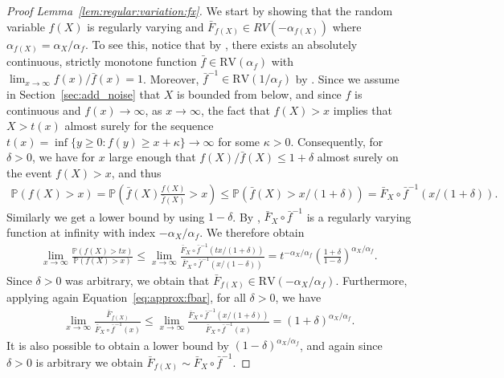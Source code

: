 \documentclass{statsoc}
\theoremstyle{break}
\renewcommand{\P}{\mathbb P}
\begin{document}
\begin{proof}[Proof Lemma~\ref{lem:regular:variation:fx}]
	We start by showing that the random variable $f(X)$ is regularly varying and $\bar F_{f(X)} \in RV(-\alpha_{f(X)})$ where $\alpha_{f(X)} = \alpha_X/\alpha_f$. 
	To see this, notice that by \citet[Proposition 2.6(vii)]{resnick:2007}, there exists an absolutely continuous, strictly monotone function $\bar f \in \text{RV}(\alpha_f)$ with $\lim_{x\to\infty} f(x) / \bar f(x) = 1$.
	Moreover, $\bar f^{-1} \in \text{RV}(1/\alpha_f)$ by \citet[Proposition 2.6(v)]{resnick:2007}. Since we assume in Section~\ref{sec:add_noise} that $X$ is bounded from below, and since $f$ is continuous and $f(x) \to \infty$, as $x \to \infty$, the fact that $f(X)>x$ implies that $X>t(x)$ almost surely for the sequence $t(x) = \inf\{y\geq 0: f(y) \geq x + \kappa\} \to \infty$ for some $\kappa>0$. Consequently, for $\delta > 0$, we have for $x$ large enough that ${f(X)}/{\bar f(X)} \leq 1 + \delta$ almost surely on the event $f(X)>x$, and thus 
	\begin{align}\label{eq:approx:fbar}
		\P(f(X) > x) = \P(\bar f(X) \frac{f(X)}{\bar f(X)} > x) \leq  \P(\bar f(X) > x/(1+\delta)) = \bar F_X \circ \bar f^{-1}(x/(1+\delta)).
	\end{align}
	Similarly we get a lower bound by using $1 -\delta$. By \citet[Proposition 2.6(v)]{resnick:2007}, $\bar F_X \circ \bar f^{-1}$ is a regularly varying function at infinity with index $- \alpha_X/\alpha_f$. We therefore obtain
	\begin{align}\label{eq:fX}
		\lim_{x\to\infty} \frac{\P(f(X) > tx)}{\P(f(X) > x)} \leq  
		\lim_{x\to\infty} \frac{\bar F_X \circ \bar f^{-1}(tx/(1+\delta))}{\bar F_X \circ \bar f^{-1}(x/(1-\delta))} = t^{- \alpha_X/\alpha_f} \left(\frac{1+\delta}{1-\delta}\right)^{\alpha_X/\alpha_f}.
	\end{align}
	Since $\delta>0$ was arbitrary, we obtain that $\bar F_{f(X)} \in \text{RV}(-\alpha_X/\alpha_f)$.
	Furthermore, applying again Equation~\eqref{eq:approx:fbar}, for all $\delta > 0$, we have
	\begin{align*}
		\lim_{x \to \infty}\frac{ \bar F_{f(X)} }{ \bar F_X \circ \bar f^{-1}(x) } \leq
		\lim_{x \to \infty}
		 \frac{\bar F_X \circ \bar f^{-1}(x/(1+\delta))}{ \bar F_X \circ \bar f^{-1}(x) } 
		 = (1+\delta)^{\alpha_X/\alpha_f}.
	\end{align*}	
	It is also possible to obtain a lower bound by $(1-\delta)^{\alpha_X/\alpha_f}$, and again since $\delta > 0$ is arbitrary we obtain $\bar F_{f(X)} \sim \bar F_X \circ \bar f^{-1} $. 

\end{proof}
\end{document}
